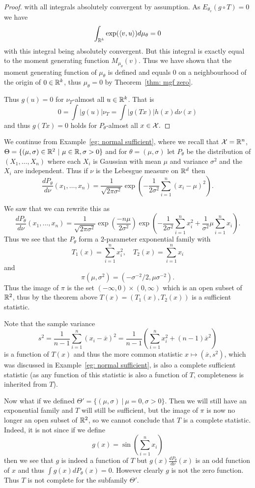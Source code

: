 \documentclass[twoside, a4paper, 10pt]{amsart}
\begin{document}
\begin{proof}
with all integrals absolutely convergent by assumption. As $E_{\theta_v}(g \circ T) = 0$ we have $$\int_{\mathbb{R}^k} \exp(\langle v, u \rangle) d\mu_{\theta} = 0$$ with this integral being absolutely convergent. 
But this integral is exactly equal to the moment generating function $M_{\mu_{\theta}}(v)$. Thus we have shown that the moment generating function of $\mu_{\theta}$ is defined and equals $0$ on a neighbourhood of the origin of $0 \in \mathbb{R}^k$, thus $\mu_{\theta} = 0$ by Theorem~\ref{thm: mgf zero}. 

Thus $g(u) = 0$ for $\nu_T$-almost all $u \in \mathbb{R}^k$. That is $$0 = \int |g(u)| \nu_T = \int |g(Tx)|h(x) d\nu(x)$$ and thus $g(Tx) = 0$ holds for $P_{\theta}$-almost all $x \in \mathcal{X}.$\end{proof}

\begin{eg}
We continue from Example~\ref{eg: normal sufficient}, where we recall that $\mathcal{X} = \mathbb{R}^n$, $\Theta = \{ (\mu, \sigma) \in \mathbb{R}^2 ~|~ \mu \in \mathbb{R}, \sigma>0\}$ and for $\theta = (\mu, \sigma)$ let $P_{\theta}$ be the distribution of $(X_1, \ldots, X_n)$ where each $X_i$ is Gaussian with mean $\mu$ and variance $\sigma^2$ and the $X_i$ are independent. Thus if $\nu$ is the Lebesgue measure on $\mathbb{R}^d$ then $$\frac{dP_{\theta}}{d\nu}(x_1, \ldots, x_n) = \frac{1}{\sqrt{2\pi\sigma^2}} \exp\left(-\frac{1}{2\sigma^2}\sum_{i=1}^n(x_i - \mu)^2 \right). $$

We saw that we can rewrite this as $$\frac{dP_{\theta}}{d\nu}(x_1, \ldots, x_n)  = \frac{1}{\sqrt{2\pi\sigma^2}} \exp\left( \frac{-n\mu}{2\sigma^2} \right) \exp\left(-\frac{1}{2\sigma^2}\sum_{i=1}^n x_i^2 +\frac{1}{\sigma^2}\mu \sum_{i=1}^n x_i\right).$$ Thus we see that the $P_{\theta}$ form a $2$-parameter exponential family with $$T_1(x) = \sum_{i=1}^n x_i^2, \quad T_2(x) = \sum_{i=1}^n x_i$$ and $$\pi(\mu, \sigma^2) = (-\sigma^{-2}/2, \mu \sigma^{-2}).$$ Thus the image of $\pi$ is the set $(-\infty, 0) \times (0,\infty)$ which is an open subset of $\mathbb{R}^2$, thus by the theorem above $T(x) = (T_1(x), T_2(x))$ is a sufficient statistic.

Note that the sample variance $$s^2 = \frac{1}{n-1}\sum_{i=1}^n (x_i - \overline{x})^2 = \frac{1}{n-1}\left( \sum_{i=1}^n x_i^2 + (n-1)\overline{x}^2 \right)$$ is a function of $T(x)$ and thus the more common statistic $x \mapsto (\overline{x}, s^2)$, which was discussed in Example~\ref{eg: normal sufficient}, is also a complete sufficient statistic (as any function of this statistic is also a function of $T$, completeness is inherited from $T$).

Now what if we defined $\Theta' = \{ (\mu, \sigma) ~|~ \mu = 0, \sigma > 0 \}$. Then we will still have an exponential family and $T$ will still be sufficient, but the image of $\pi$ is now no longer an open subset of $\mathbb{R}^2$, so we cannot conclude that $T$ is a complete statistic. Indeed, it is not since if we define $$g(x) = \sin\left(\sum_{i=1}^n x_i\right)$$ then we see that $g$ is indeed a function of $T$ but $g(x) \frac{dP_{\theta}}{d\nu}(x)$ is an odd function of $x$ and thus $\int g(x) dP_{\theta}(x) = 0$. However clearly $g$ is not the zero function. Thus $T$ is not complete for the subfamily $\Theta'$.
\end{eg}
\end{document}
